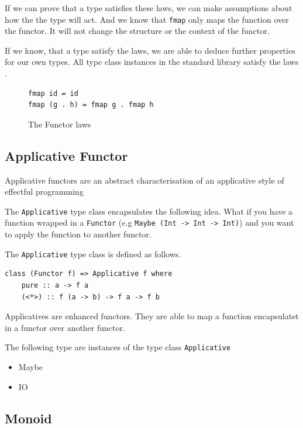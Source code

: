 \documentclass[twoside, a4paper, 12pt]{article}
\begin{document}
If we can prove that a type satisfies these laws, we can make assumptions about how the the type will act. And we know that \verb|fmap| only maps the function over the functor. It will not change the structure or the context of the functor.

If we know, that a type satisfy the laws, we are able to deduce further properties for our own types. All type class instances in the standard library satisfy the laws \cite{yorgey}.

\begin{figure}
  \centering
\begin{verbatim}
fmap id = id
fmap (g . h) = fmap g . fmap h
\end{verbatim}
  \caption{The Functor laws}
  \label{fig:functorlaws}
\end{figure}

\subsection{Applicative Functor}
\label{sec:applicatives}

Applicative functors are an abstract characterisation of an applicative style of effectful programming \cite{mcbride} \cite{control.applicative}

The \verb|Applicative| type class encapsulates the following idea. What if you have a function wrapped in a \verb|Functor| (e.g \verb|Maybe (Int -> Int -> Int)|) and you want to apply the function to another functor. 

The \verb|Applicative| type class is defined as follows.
\begin{verbatim}
class (Functor f) => Applicative f where
    pure :: a -> f a
    (<*>) :: f (a -> b) -> f a -> f b
\end{verbatim}

Applicatives are enhanced functors. They are able to map a function encapsulatet in a functor over another functor.

The following type are instances of the type class \verb|Applicative|

\begin{itemize}
\item Maybe
\item IO
\end{itemize}

\subsection{Monoid}
\label{sec:monoid}
\end{document}
